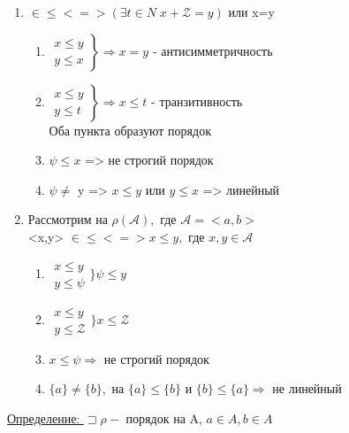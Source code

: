 \documentclass[12pt]{article}
\begin{document}
    \begin{enumerate}
        \item <x,y> $\in \leq <=>(\exists t \in N \; x+\mathcal{Z}=y)$ или x=y
        \begin{enumerate}
            \item $\left.
              \begin{aligned}
                x \leq y \\
                y \leq x
              \end{aligned}
              \right\} \Rightarrow x = y$ - антисимметричность
            \item $\left.
              \begin{aligned}
                x \leq y \\
                y \leq t
              \end{aligned}
              \right\} \Rightarrow x \leq t$ - транзитивность\\
              Оба пункта образуют порядок
            \item $\psi \leq x$ => не строгий порядок
            \item $\psi \not =$ y => $x \leq y$ или $y \leq x$ => линейный
        \end{enumerate}
        \item Рассмотрим на $\rho(\mathcal{A}),$ где $\mathcal{A}=<a,b>$\\
        <x,y> $\in \leq <=> x \leq y,$ где $x,y \in \mathcal{A}$
        \begin{enumerate}
            \item $\begin{aligned}
                x \leq y\\
                y \leq \psi
            \end{aligned}\Bigg\} \psi \leq y$
            \item $\begin{aligned}
                x \leq y\\
                y \leq \mathcal{Z}
            \end{aligned}\Bigg\} x \leq \mathcal{Z}$
            \item $x \leq \psi \Rightarrow$ не строгий порядок
            \item $\{a\} \not = \{b\},$ на $\{a\} \leq \{b\}$ и $\{b\} \leq \{a\} \Rightarrow $ не линейный
        \end{enumerate}
    \end{enumerate}
    \underline{Определение: }$\sqsupset \rho-$ порядок на A, $a \in A,b \in A$
\end{document}
